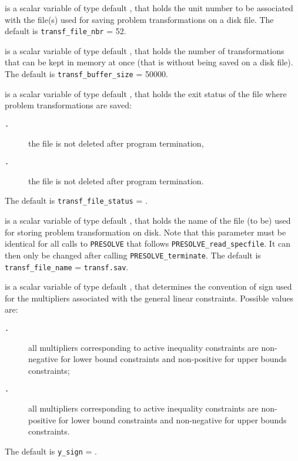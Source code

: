 \documentclass{galahad}
\newcommand{\packagename}{PRESOLVE}
\newcommand{\sym}{\tt\small}
\begin{document}
\begin{description}
 is a scalar variable of type default \integer, that
holds the unit number to be associated with the file(s) used
for saving problem transformations on a disk file.
The default is {\tt transf\_file\_nbr} = 52.

 is a scalar variable of type default \integer, that
holds the number of transformations that can be kept in memory
at once (that is without being saved on a disk file).
The default is {\tt transf\_buffer\_size} = 50000.

 is a scalar variable of type default \integer, that
holds the exit status of the file where problem transformations are saved:
\begin{description}
\item[\sym \galsymkeep.] the file is not deleted after program termination,
\item[\sym \galsymdelete.] the file is not deleted after program termination.
\end{description}
The default is {\tt transf\_file\_status} = {\sym \galsymkeep}.

 is a scalar variable of type default \integer, that
holds the name of the file (to be) used for storing problem transformation on
disk. Note that this parameter must be identical for all calls to
{\tt \packagename} that follows {\tt \packagename\_read\_specfile}. It can
then only be changed after calling {\tt \packagename\_terminate}.
The default is {\tt transf\_file\_name} = {\tt transf.sav}.

 is a scalar variable of type default \integer, that
determines the convention of sign used for the multipliers
associated with the general linear constraints. Possible values are:
\begin{description}
\item[\sym \galsympositive.] all multipliers corresponding to active
                inequality constraints are non-negative for
                lower bound constraints and non-positive for
                upper bounds constraints;
\item[\sym \galsymnegative.] all multipliers corresponding to active
                inequality constraints are non-positive for
                lower bound constraints and non-negative for
                upper bounds constraints.
\end{description}
The default is {\tt y\_sign} = {\sym \galsympositive}.


\end{description}
\end{document}
